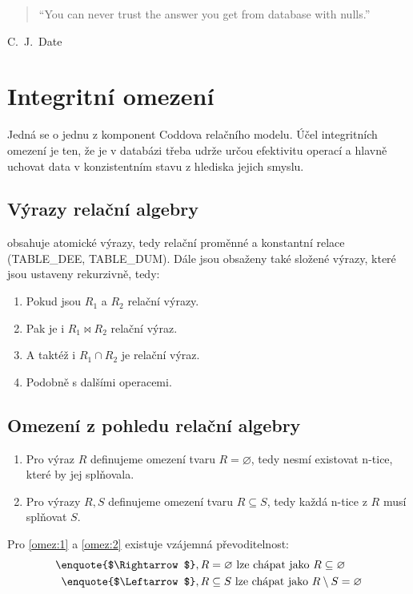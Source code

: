 \begin{quote}
\foreignlanguage{english}{\enquote{You can never trust the answer you get from database with nulls.}}
\end{quote}
\hfill C.~J.~Date

\section{Integritní omezení}
Jedná se o jednu z komponent Coddova relačního modelu. Účel integritních omezení je ten, že je v databázi třeba udrže určou efektivitu operací a hlavně uchovat data v konzistentním stavu z hlediska jejich smyslu.

\subsection{Výrazy relační algebry}
 obsahuje atomické výrazy, tedy relační proměnné a konstantní relace (TABLE\_DEE, TABLE\_DUM). Dále jsou obsaženy také složené výrazy, které jsou ustaveny rekurzivně, tedy:
\begin{enumerate}
\item Pokud jsou $R_{1}$ a $R_{2}$ relační výrazy.
\item Pak je i $R_{1} \Join R_{2}$ relační výraz.
\item A taktéž i $R_{1} \cap R_{2}$ je relační výraz.
\item Podobně s dalšími operacemi.
\end{enumerate}

\subsection{Omezení z pohledu relační algebry}
\begin{enumerate}
\item\label{omez:1} Pro výraz $R$ definujeme omezení tvaru $R = \varnothing$, tedy nesmí existovat n-tice, které by jej splňovala.
\item\label{omez:2} Pro výrazy $R, S$ definujeme omezení tvaru $R \subseteq S$, tedy každá n-tice z $R$ musí splňovat $S$.
\end{enumerate}
Pro \ref{omez:1} a \ref{omez:2} existuje vzájemná převoditelnost:
\begin{align*}
\text{\enquote{$\Rightarrow$}}&, R = \varnothing \text{ lze chápat jako } R \subseteq \varnothing \\
\text{\enquote{$\Leftarrow$}}&, R \subseteq S \text{ lze chápat jako } R \setminus S = \varnothing
\end{align*}

